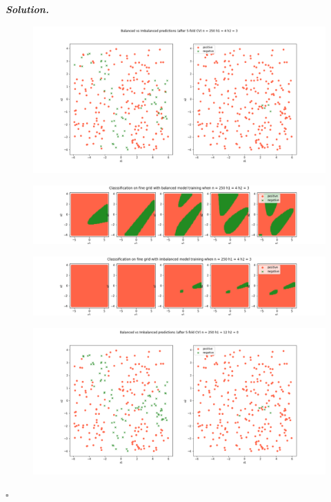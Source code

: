 \documentclass[10pt]{article}
\newenvironment{solution}[1][\it{Solution}]{\textbf{#1. } }{$\square$}
\begin{document}
\begin{solution}
\begin{figure}[H]
\end{figure}
\begin{figure}[H]
\includegraphics[width=16cm, keepaspectratio]{./3/10}
\end{figure}
\begin{figure}[H]
\includegraphics[width=16cm, keepaspectratio]{./3/11}
\end{figure}
\begin{figure}[H]
\includegraphics[width=16cm, keepaspectratio]{./3/12}
\end{figure}
\begin{figure}[H]
\includegraphics[width=16cm, keepaspectratio]{./3/13}
\end{figure}

\end{solution}
\end{document}

